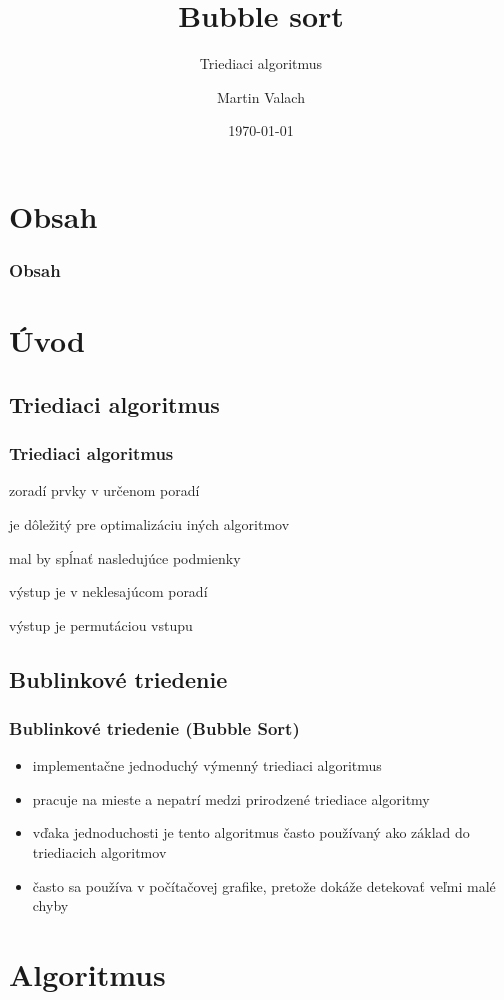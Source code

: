 \documentclass{beamer}
\title{Bubble sort}
\subtitle{Triediaci algoritmus}
\author{Martin Valach}
\date{\today}
\newcommand{\SubItem}[1]
{
	{\setlength\itemindent{15pt} \item[-] #1}
}
\begin{document}
	\begin{frame}
		\titlepage
	\end{frame}

	\section*{Obsah}
	\begin{frame}
		\frametitle{Obsah}
		\tableofcontents
	\end{frame}

	\section{Úvod}
	\subsection{Triediaci algoritmus}
	\begin{frame}
		\begin{itemize}
			\frametitle{Triediaci algoritmus}
			\item zoradí prvky v určenom poradí
			\item je dôležitý pre optimalizáciu iných algoritmov
			\item mal by spĺnať nasledujúce podmienky
			\SubItem{výstup je v neklesajúcom poradí}
			\SubItem{výstup je permutáciou vstupu}
		\end{itemize}
	\end{frame}


	\subsection{Bublinkové triedenie}
	\begin{frame}
		\frametitle{Bublinkové triedenie (Bubble Sort)}
		\begin{itemize}
			\item implementačne jednoduchý výmenný triediaci algoritmus
			\item pracuje na mieste a nepatrí medzi prirodzené triediace algoritmy
			\item vďaka jednoduchosti je tento algoritmus často používaný ako základ do triediacich algoritmov
			\item často sa používa v počítačovej grafike, pretože dokáže detekovať veľmi malé chyby
		\end{itemize}
	\end{frame}

	\section{Algoritmus}	
\end{document}
